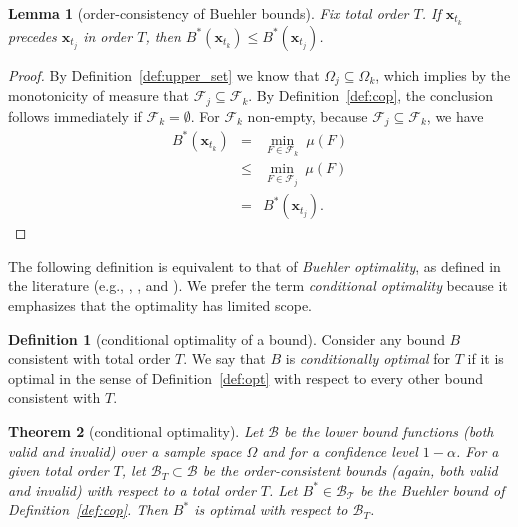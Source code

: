 \documentclass{article}
\newtheorem{theorem}{Theorem}[section]
\newtheorem{lemma}[theorem]{Lemma}
\theoremstyle{definition}
\newtheorem{definition}{Definition}[section]
\theoremstyle{remark}
\def\x{\mathbf{x}}
\begin{document}
\begin{lemma}[order-consistency of Buehler bounds]
\label{lemma:incremental_sums}
Fix total order $T$. If $\x_{t_k}$ precedes $\x_{t_j}$ in order $T$, then $B^*(\x_{t_k}) \leq B^*(\x_{t_j})$. 
\end{lemma}
\begin{proof}
    By Definition~\ref{def:upper_set} we know that $\Omega_j \subseteq \Omega_k$, which implies by the monotonicity of measure that $\mathcal{F}_j \subseteq \mathcal{F}_k$. By Definition~\ref{def:cop}, the conclusion follows immediately if $\mathcal{F}_k = \emptyset$. For $\mathcal{F}_k$ non-empty, because $\mathcal{F}_j \subseteq \mathcal{F}_k$, we have
    \begin{eqnarray}
        B^*(\x_{t_k}) &=& \underset{F\in \mathcal{F}_k}{\min} \;\mu(F) \\
        &\leq& \underset{F\in \mathcal{F}_j}{\min} \;\mu(F) \\
        &=& B^*(\x_{t_j}).
    \end{eqnarray}
\end{proof}


The following definition is equivalent to that of \emph{Buehler optimality}, as defined in the literature (e.g., \cite{reiser1991comment}, \cite{jobe1992buehler}, and \cite{willits1997series}). We prefer the term \emph{conditional optimality} because it emphasizes that the optimality has limited scope.

\begin{definition}[conditional optimality of a bound]
\label{def:cond_opt}
    Consider any bound $B$ consistent with total order $T$. We say that $B$ is \emph{conditionally optimal} for $T$ if it is optimal in the sense of Definition~\ref{def:opt} with respect to every other bound consistent with $T$.
\end{definition}
\color{black}

\begin{theorem}[conditional optimality]
\label{thm:conditional_optimality}
Let $\mathcal{B}$ be the lower bound functions (both valid and invalid) over a sample space $\Omega$ and for a confidence level $1-\alpha$. For a given total order $T$, let $\mathcal{B}_T\subset \mathcal{B}$ be the order-consistent bounds (again, both valid and invalid) with respect to a total order $T$. Let $B^*\in \mathcal{B_T}$ be the Buehler bound of Definition~\ref{def:cop}. Then $B^*$ is optimal with respect to $\mathcal{B}_T$. 
\end{theorem}
\end{document}
